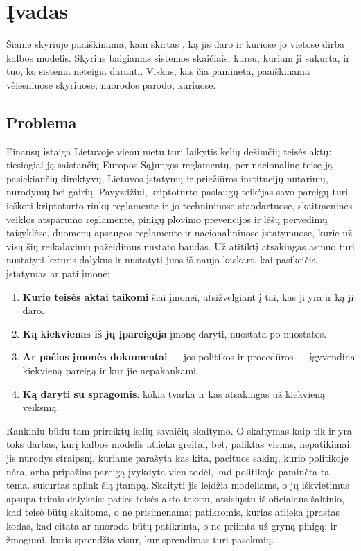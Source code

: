 \chapter{Įvadas}\label{ch:intro}

Šiame skyriuje paaiškinama, kam skirtas \product{}, ką jis daro ir kuriose jo vietose dirba
kalbos modelis. Skyrius baigiamas sistemos skaičiais, kursu, kuriam ji sukurta, ir tuo, ko
sistema neteigia daranti.
Viskas, kas čia paminėta, paaiškinama vėlesniuose skyriuose; nuorodos parodo, kuriuose.

\section{Problema}\label{sec:intro:problem}

Finansų įstaiga Lietuvoje vienu metu turi laikytis kelių dešimčių teisės aktų: tiesiogiai ją
saistančių Europos Sąjungos reglamentų, per nacionalinę teisę ją pasiekiančių direktyvų,
Lietuvos įstatymų ir priežiūros institucijų nutarimų, nurodymų bei gairių. Pavyzdžiui,
kriptoturto paslaugų teikėjas savo pareigų turi ieškoti kriptoturto rinkų reglamente ir jo
techniniuose standartuose, skaitmeninės veiklos atsparumo reglamente, pinigų plovimo
prevencijos ir lėšų pervedimų taisyklėse, duomenų apsaugos reglamente ir nacionaliniuose
įstatymuose, kurie už visų šių reikalavimų pažeidimus nustato baudas. Už atitiktį atsakingas
asmuo turi nustatyti keturis dalykus ir nustatyti juos iš naujo kaskart, kai pasikeičia
įstatymas ar pati įmonė:

\begin{enumerate}
  \item \textbf{Kurie teisės aktai taikomi} šiai įmonei, atsižvelgiant į tai, kas ji yra ir ką
        ji daro.
  \item \textbf{Ką kiekvienas iš jų įpareigoja} įmonę daryti, nuostata po nuostatos.
  \item \textbf{Ar pačios įmonės dokumentai} --- jos politikos ir procedūros --- įgyvendina
        kiekvieną pareigą ir kur jie nepakankami.
  \item \textbf{Ką daryti su spragomis}: kokia tvarka ir kas atsakingas už kiekvieną veiksmą.
\end{enumerate}

Rankiniu būdu tam prireiktų kelių savaičių skaitymo. O skaitymas kaip tik ir yra toks darbas, kurį kalbos
modelis atlieka greitai, bet, paliktas vienas, nepatikimai: jis nurodys straipsnį, kuriame
parašyta kas kita, pacituos sakinį, kurio politikoje nėra, arba pripažins pareigą įvykdyta
vien todėl, kad politikoje paminėta ta tema. \product{} sukurtas aplink šią įtampą. Skaityti
jis leidžia modeliams, o jų iškvietimus apsupa trimis dalykais: paties teisės akto tekstu,
atsisiųstu iš oficialaus šaltinio, kad teisė būtų skaitoma, o ne prisimenama; patikromis,
kurias atlieka įprastas kodas, kad citata ar nuoroda būtų patikrinta, o ne priimta už gryną
pinigą; ir žmogumi, kuris sprendžia visur, kur sprendimas turi pasekmių.

